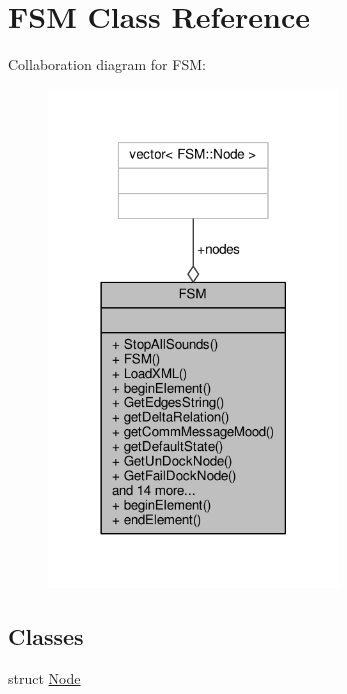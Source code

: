 \hypertarget{classFSM}{}\section{F\+SM Class Reference}
\label{classFSM}


Collaboration diagram for F\+SM\+:
\nopagebreak
\begin{figure}[H]
\begin{center}
\leavevmode
\includegraphics[width=218pt]{dc/d55/classFSM__coll__graph}
\end{center}
\end{figure}
\subsection*{Classes}
\begin{DoxyCompactItemize}
\item 
struct \hyperlink{structFSM_1_1Node}{Node}
\end{DoxyCompactItemize}
